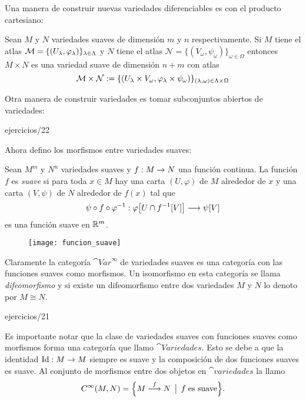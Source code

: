\documentclass[../../topologia_algebraica]{subfiles}
\begin{document}
Una manera de construir nuevas variedades diferenciables es con el producto cartesiano:

\begin{prop}
  Sean $M$ y $N$ variedades suaves de dimensi\'on $m$ y $n$ respectivamente. Si $M$ tiene
el atlas $\mathcal{M}=\{(U_{\lambda},\varphi_{\lambda})\}_{\lambda\in\Lambda}$ y $N$ tiene el atlas
$\mathcal{N}=\{(V_{\omega},\psi_{\omega})\}_{\omega\in\Omega}$ entonces $M\times N$ es una
variedad suave de dimensi\'on $n+m$ con atlas
\[
  \mathcal{M}\times\mathcal{N}:=
  \{(U_{\lambda}\times V_{\omega},\varphi_{\lambda}\times\psi_{\omega})\}_{(\lambda,\omega)\in\Lambda\times\Omega}
\]
\end{prop}

Otra manera de construir variedades es tomar subconjuntos abiertos de variedades:

{ejercicios/22} %

Ahora defino los morfismos entre variedades suaves:

\begin{defin}
  Sean $M^m$ y $N^n$ variedades suaves y $f:M\rightarrow N$ una funci\'on continua. La funci\'on $f$ es
  \emph{suave} si para toda $x\in M$ hay una carta $(U,\varphi)$ de $M$ alrededor de $x$ y una carta
  $(V,\psi)$ de $N$ alrededor de $f(x)$ tal que
\[
  \psi\circ f\circ\varphi^{-1}:\varphi\big[U\cap f^{-1}[V]\big] \longrightarrow \psi[V]
\]
  es una funci\'on suave en $\mathbb{R}^m$.
\end{defin}
  \begin{figure}[ht]%
    \centering
    \texttt{[image: funcion\_suave]}
  \end{figure}%

Claramente la categor\'ia $\cat{Var}^{\infty}$ de variedades suaves es una categor\'ia con
las funciones suaves como morfismos. Un isomorfismo en esta categor\'ia se llama
\emph{difeomorfismo} y si existe un difeomorfismo entre dos variedades $M$ y $N$ lo denoto por
$M\cong N$.

{ejercicios/21} %

Es importante notar que la clase de variedades suaves con funciones suaves como morfismos forma una
categor\'ia que llamo $\cat{Variedades}$. Esto se debe a que la identidad $\text{Id}:M\rightarrow M$ siempre es
suave y la composici\'on de dos funciones suaves es suave. Al conjunto de morfismos entre dos
objetos en $\cat{variedades}$ la llamo
\[
    C^{\infty}(M,N) = \Big\{ M\overset{f}{\longrightarrow} N \;\,\big|\;\, f\;\text{es suave}  \Big\}.
\]
\end{document}
